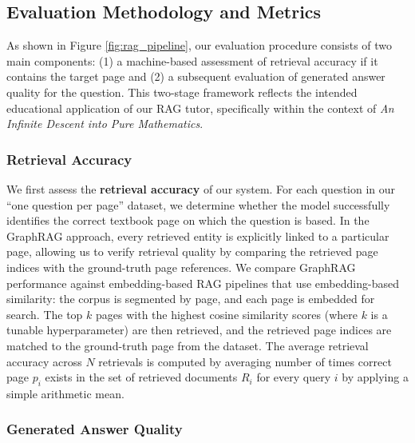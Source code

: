 \documentclass[runningheads]{llncs}
\begin{document}
\subsection{Evaluation Methodology and Metrics}\label{sec:eval}

As shown in Figure \ref{fig:rag_pipeline}, our evaluation procedure consists of two main components: (1) a machine-based assessment of retrieval accuracy if it contains the target page and (2) a subsequent evaluation of generated answer quality for the question. This two-stage framework reflects the intended educational application of our RAG tutor, specifically within the context of \emph{An Infinite Descent into Pure Mathematics}.

\subsubsection{Retrieval Accuracy} We first assess the \textbf{retrieval accuracy} of our system. For each question in our “one question per page” dataset, we determine whether the model successfully identifies the correct textbook page on which the question is based. In the GraphRAG approach, every retrieved entity is explicitly linked to a particular page, allowing us to verify retrieval quality by comparing the retrieved page indices with the ground-truth page references. We compare GraphRAG performance against embedding-based RAG pipelines that use embedding-based similarity: the corpus is segmented by page, and each page is embedded for search. The top $k$ pages with the highest cosine similarity scores (where $k$ is a tunable hyperparameter) are then retrieved, and the retrieved page indices are matched to the ground-truth page from the dataset. The average retrieval accuracy across $N$ retrievals is computed by averaging number of times correct page $p_i$ exists in the set of retrieved documents $R_i$ for every query $i$ by applying a simple arithmetic mean.


\subsubsection{Generated Answer Quality}
\end{document}
